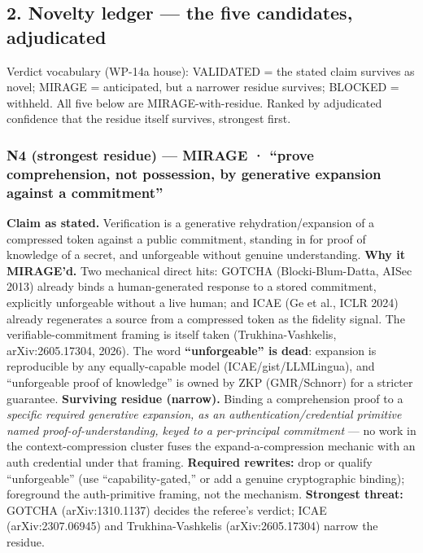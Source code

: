 \documentclass[
  11pt,
]{article}
\begin{document}
\subsection{2. Novelty ledger --- the five candidates,
adjudicated}\label{novelty-ledger-the-five-candidates-adjudicated}

Verdict vocabulary (WP-14a house): VALIDATED = the stated claim survives
as novel; MIRAGE = anticipated, but a narrower residue survives; BLOCKED
= withheld. All five below are MIRAGE-with-residue. Ranked by
adjudicated confidence that the residue itself survives, strongest
first.

\subsubsection{N4 (strongest residue) --- MIRAGE · ``prove
comprehension, not possession, by generative expansion against a
commitment''}\label{n4-strongest-residue-mirage-prove-comprehension-not-possession-by-generative-expansion-against-a-commitment}

\textbf{Claim as stated.} Verification is a generative
rehydration/expansion of a compressed token against a public commitment,
standing in for proof of knowledge of a secret, and unforgeable without
genuine understanding. \textbf{Why it MIRAGE'd.} Two mechanical direct
hits: GOTCHA (Blocki-Blum-Datta, AISec 2013) already binds a
human-generated response to a stored commitment, explicitly unforgeable
without a live human; and ICAE (Ge et al., ICLR 2024) already
regenerates a source from a compressed token as the fidelity signal. The
verifiable-commitment framing is itself taken (Trukhina-Vashkelis,
arXiv:2605.17304, 2026). The word \textbf{``unforgeable'' is dead}:
expansion is reproducible by any equally-capable model
(ICAE/gist/LLMLingua), and ``unforgeable proof of knowledge'' is owned
by ZKP (GMR/Schnorr) for a stricter guarantee. \textbf{Surviving residue
(narrow).} Binding a comprehension proof to a \emph{specific required
generative expansion, as an authentication/credential primitive named
proof-of-understanding, keyed to a per-principal commitment} --- no work
in the context-compression cluster fuses the expand-a-compression
mechanic with an auth credential under that framing. \textbf{Required
rewrites:} drop or qualify ``unforgeable'' (use ``capability-gated,'' or
add a genuine cryptographic binding); foreground the auth-primitive
framing, not the mechanism. \textbf{Strongest threat:} GOTCHA
(arXiv:1310.1137) decides the referee's verdict; ICAE (arXiv:2307.06945)
and Trukhina-Vashkelis (arXiv:2605.17304) narrow the residue.
\end{document}
